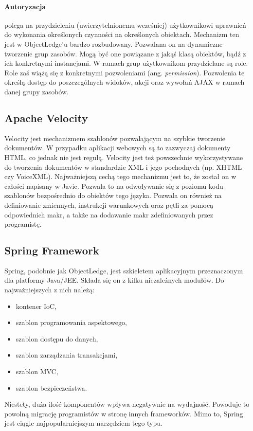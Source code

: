 \paragraph{Autoryzacja} polega na przydzieleniu (uwierzytelnionemu wcześniej) użytkownikowi uprawnień do wykonania określonych czynności na określonych obiektach. Mechanizm ten jest w ObjectLedge'u bardzo rozbudowany. Pozwalana on na dynamiczne tworzenie grup zasobów. Mogą być one powiązane z jakąś klasą obiektów, bądź z ich konkretnymi instancjami. W ramach grup użytkownikom przydzielane są role. Role zaś wiążą się z konkretnymi pozwoleniami (ang. \textit{permission}). Pozwolenia te określą dostęp do poszczególnych widoków, akcji oraz wywołań AJAX w ramach danej grupy zasobów.

\subsection[Apache Velocity][Apache Velocity]{Apache Velocity}
\label{velocity}
Velocity jest mechanizmem szablonów pozwalającym na szybkie tworzenie dokumentów. W przypadku aplikacji webowych są to zazwyczaj dokumenty HTML, co jednak nie jest regułą. Velocity jest też powszechnie wykorzystywane do tworzenia dokumentów w standardzie XML i jego pochodnych (np. XHTML czy VoiceXML). Najważniejszą cechą tego mechanizmu jest to, że został on w całości napisany w Javie. Pozwala to na odwoływanie się z poziomu kodu szablonów bezpośrednio do obiektów tego języka. Pozwala on również na definiowanie zmiennych, instrukcji warunkowych oraz pętli za pomocą odpowiednich makr, a także na dodawanie makr zdefiniowanych przez programistę.

\subsection[Spring Framework][Spring Framework]{Spring Framework}
Spring, podobnie jak ObjectLedge, jest szkieletem aplikacyjnym przeznaczonym dla platformy Java/JEE. Składa się on z kilku niezależnych modułów. Do najważniejszych z nich należą:
\begin{itemize}
	\item kontener IoC, 
	\item szablon programowania aspektowego,
	\item szablon dostępu do danych,
	\item szablon zarządzania transakcjami,
	\item szablon MVC,
	\item szablon bezpieczeństwa.
\end{itemize}
Niestety, duża ilość komponentów wpływa negatywnie na wydajność. Powoduje to powolną migrację programistów w stronę innych frameworków. Mimo to, Spring jest ciągle najpopularniejszym narzędziem tego typu.


